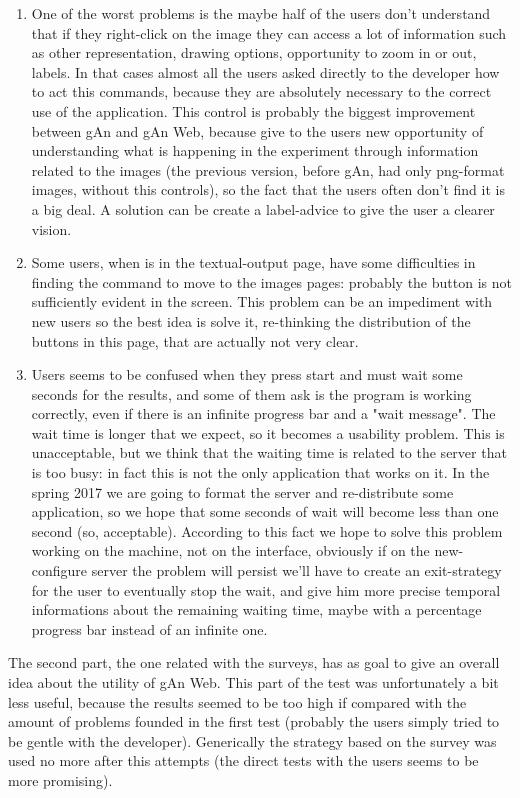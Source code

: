 \begin{enumerate}
\item 
One of the worst problems is the maybe half of the users don't understand that if they right-click on the image they can access a lot of information such as other representation, drawing options, opportunity to zoom in or out, labels. In that cases almost all the users asked directly to the developer how to act this commands, because they are absolutely necessary to the correct use of the application. This control is probably the biggest improvement between gAn and gAn Web, because give to the users new opportunity of understanding what is happening in the experiment through information related to the images (the previous version, before gAn, had only png-format images, without this controls), so the fact that the users often don't find it is a big deal. A solution can be create a label-advice to give the user a clearer vision.

\item
Some users, when is in the textual-output page, have some difficulties in finding the command to move to the images pages: probably the button is not sufficiently evident in the screen. This problem can be an impediment with new users so the best idea is solve it, re-thinking the distribution of the buttons in this page, that are actually not very clear. 

\item
Users seems to be confused when they press start and must wait some seconds for the results, and some of them ask is the program is working correctly, even if there is an infinite progress bar and a "wait message". The wait time is longer that we expect, so it becomes a usability problem. This is unacceptable, but we think that the waiting time is related to the server that is too busy: in fact this is not the only application that works on it. In the spring 2017 we are going to format the server and re-distribute some application, so we hope that some seconds of wait will become less than one second (so, acceptable). According to this fact we hope to solve this problem working on the machine, not on the interface, obviously if on the new-configure server the problem will persist we'll have to create an exit-strategy for the user to eventually stop the wait, and give him more precise temporal informations about the remaining waiting time, maybe with a percentage progress bar instead of an infinite one.

\end{enumerate}

The second part, the one related with the surveys, has as goal to give an overall idea about the utility of gAn Web. This part of the test was unfortunately a bit less useful, because the results seemed to be too high if compared with the amount of problems founded in the first test (probably the users simply tried to be gentle with the developer). Generically the strategy based on the survey was used no more after this attempts (the direct tests with the users seems to be more promising).

